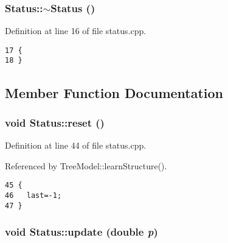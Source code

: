 \hypertarget{class_status_1b24d90ef2560afffe9d7183e279c63c}{
\subsubsection[$\sim$Status]{\setlength{\rightskip}{0pt plus 5cm}Status::$\sim$Status ()}}
\label{class_status_1b24d90ef2560afffe9d7183e279c63c}




Definition at line 16 of file status.cpp.

\begin{Code}\begin{verbatim}17 {
18 }
\end{verbatim}\end{Code}




\subsection{Member Function Documentation}
\hypertarget{class_status_5fc321167c6d5eae2dde25c6e01aae8e}{
\subsubsection[reset]{\setlength{\rightskip}{0pt plus 5cm}void Status::reset ()}}
\label{class_status_5fc321167c6d5eae2dde25c6e01aae8e}




Definition at line 44 of file status.cpp.

Referenced by Tree\-Model::learn\-Structure().

\begin{Code}\begin{verbatim}45 {
46   last=-1;
47 }
\end{verbatim}\end{Code}


\hypertarget{class_status_13804447fd8e38409dce866c8b77703f}{
\subsubsection[update]{\setlength{\rightskip}{0pt plus 5cm}void Status::update (double {\em p})}}
\label{class_status_13804447fd8e38409dce866c8b77703f}




